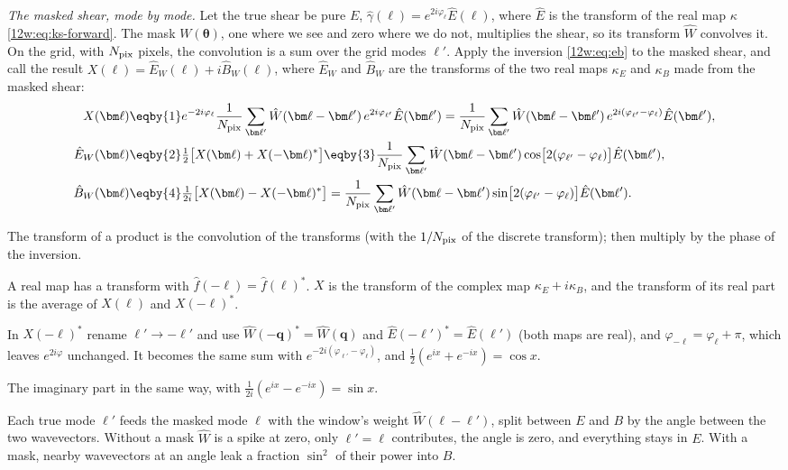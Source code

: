 \emph{The masked shear, mode by mode.} Let the true shear be pure $E$, $\hat\gamma(\bm\ell)=e^{2i\varphi_\ell}
\hat E(\bm\ell)$, where $\hat E$ is the transform of the real map $\kappa$ \eqref{12w:eq:ks-forward}. The mask
$W(\bm\theta)$, one where we see and zero where we do not, multiplies the shear, so its transform $\hat W$ convolves
it. On the grid, with $N_{\rm pix}$ pixels, the convolution is a sum over the grid modes $\bm\ell'$. Apply the
inversion \eqref{12w:eq:eb} to the masked shear, and call the result $X(\bm\ell)=\hat E_W(\bm\ell)+i\hat B_W(\bm\ell)$,
where $\hat E_W$ and $\hat B_W$ are the transforms of the two real maps $\kappa_E$ and $\kappa_B$ made from the masked
shear:
\begin{align}
X(\bm\ell)
&\eqby{1}e^{-2i\varphi_\ell}\frac1{N_{\rm pix}}\sum_{\bm\ell'}\hat W(\bm\ell-\bm\ell')\,e^{2i\varphi_{\ell'}}\hat E(\bm\ell')
=\frac1{N_{\rm pix}}\sum_{\bm\ell'}\hat W(\bm\ell-\bm\ell')\,e^{2i(\varphi_{\ell'}-\varphi_\ell)}\hat E(\bm\ell'),
\nonumber\\
\hat E_W(\bm\ell)
&\eqby{2}\tfrac12\bigl[X(\bm\ell)+X(-\bm\ell)^*\bigr]
\eqby{3}\frac1{N_{\rm pix}}\sum_{\bm\ell'}\hat W(\bm\ell-\bm\ell')\cos\bigl[2(\varphi_{\ell'}-\varphi_\ell)\bigr]\hat E(\bm\ell'),
\nonumber\\
\hat B_W(\bm\ell)
&\eqby{4}\tfrac1{2i}\bigl[X(\bm\ell)-X(-\bm\ell)^*\bigr]
=\frac1{N_{\rm pix}}\sum_{\bm\ell'}\hat W(\bm\ell-\bm\ell')\sin\bigl[2(\varphi_{\ell'}-\varphi_\ell)\bigr]\hat E(\bm\ell').
\label{12w:eq:masked-eb}
\end{align}
\begin{explain}
  \item The transform of a product is the convolution of the transforms (with the $1/N_{\rm pix}$ of the discrete
        transform); then multiply by the phase of the inversion.
  \item A real map has a transform with $\hat f(-\bm\ell)=\hat f(\bm\ell)^*$. $X$ is the transform of the complex map
        $\kappa_E+i\kappa_B$, and the transform of its real part is the average of $X(\bm\ell)$ and $X(-\bm\ell)^*$.
  \item In $X(-\bm\ell)^*$ rename $\bm\ell'\to-\bm\ell'$ and use $\hat W(-\bm q)^*=\hat W(\bm q)$ and
        $\hat E(-\bm\ell')^*=\hat E(\bm\ell')$ (both maps are real), and $\varphi_{-\ell}=\varphi_\ell+\pi$, which leaves
        $e^{2i\varphi}$ unchanged. It becomes the same sum with $e^{-2i(\varphi_{\ell'}-\varphi_\ell)}$, and
        $\frac12(e^{ix}+e^{-ix})=\cos x$.
  \item The imaginary part in the same way, with $\frac1{2i}(e^{ix}-e^{-ix})=\sin x$.
\end{explain}
Each true mode $\bm\ell'$ feeds the masked mode $\bm\ell$ with the window's weight $\hat W(\bm\ell-\bm\ell')$, split
between $E$ and $B$ by the angle between the two wavevectors. Without a mask $\hat W$ is a spike at zero, only
$\bm\ell'=\bm\ell$ contributes, the angle is zero, and everything stays in $E$. With a mask, nearby wavevectors at an
angle leak a fraction $\sin^2$ of their power into $B$.

